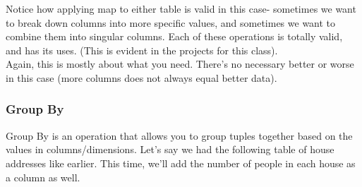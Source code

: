 \documentclass[english, 10pt]{article}
\begin{document}
{

}

\hfill \break Notice how applying map to either table is valid in this case- sometimes we want to break down columns into more specific values, and sometimes we want to combine them into singular columns. Each of these operations is totally valid, and has its uses. (This is evident in the projects for this class).\\

Again, this is mostly about what you need. There's no necessary better or worse in this case (more columns does not always equal better data).

\subsubsection{Group By}

Group By is an operation that allows you to group tuples together based on the values in columns/dimensions. Let's say we had the following table of house addresses like earlier. This time, we'll add the number of people in each house as a column as well.\\
\end{document}
